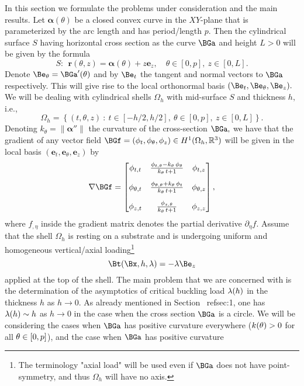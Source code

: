 In this section we formulate the problems under consideration and the main results. Let $\bm\alpha(\theta)$ be a closed convex curve in the $XY$-plane that is parameterized by the arc length and has period/length $p$. Then the cylindrical surface $S$ having horizontal cross section as the curve $\BGa$ and height $L>0$ will be given by the formula 
$$S: \ \ \bm{r}(\theta,z)=\bm\alpha(\theta)+z\bm{e}_z,\quad  \theta\in[0,p],\  z\in[0,L].$$
Denote $\Be_\Gth=\BGa'(\Gth)$ and by $\Be_t$ the tangent and normal vectors to $\BGa$ respectively. This will give rise to the local orthonormal basis 
$(\Be_t,\Be_\Gth,\Be_z).$ We will be dealing with cylindrical shells $\Omega_h$ with mid-surface $S$ and thickness $h,$ i.e., 
\begin{equation}
\label{3.1}
\Omega_{h}=\left\{(t, \theta, z) \ : \ t \in [-h/2,h/2], \ \theta \in[0, p], \ z \in[0, L]\right\}.
\end{equation}
Denoting $k_\theta=\|\bm\alpha''\|$ the curvature of the cross-section $\BGa,$ we have that the gradient of any vector field 
$\BGf=(\phi_t,\phi_\Gth,\phi_z)\in H^1(\Omega_h,\mathbb R^3)$ will be given in the local basis $(\bm{e}_t,\bm{e}_\theta,\bm{e}_z)$ by 
\begin{equation}
\label{3.2}
\nabla \BGf
=\begin{bmatrix}
\phi_{t,t} & \frac{\phi_{t,\theta}-k_{\theta }\,\phi_\theta}{k_{\theta }\,t+1} & \phi_{t,z} \\[10pt]
\phi_{\theta,t} & \frac{\phi_{\theta,\theta}+k_{\theta }\,\phi_t}{k_{\theta }\,t+1} & \phi_{\theta,z}\\[10pt] 
\phi_{z,t} & \frac{\phi_{z,\theta}}{k_{\theta }\,t+1} & \phi_{z,z} 
\end{bmatrix},
\end{equation}
where $f_{,\eta}$ inside the gradient matrix denotes the partial derivative $\partial_\eta f.$ Assume that the shell $\Omega_h$ is resting on a substrate and is undergoing uniform and homogeneous vertical/axial loading\footnote{The terminology "axial load" will be used even if $\BGa$ does not have point-symmetry, and thus $\Omega_h$ will have no axis.} 
\begin{equation}
\label{3.3}
\Bt(\Bx,h,\lambda)=-\lambda \Be_z
\end{equation}
applied at the top of the shell. The main problem that we are concerned with is the determination of the asymptotics of critical buckling load $\lambda(h)$ in the thickness $h$ as $h\to 0.$ As already mentioned in Section~ ref{sec:1}, one has $\lambda(h)\sim h$ as $h\to 0$ in the case when the cross section $\BGa$ is a circle. We will be considering the cases when $\BGa$ has positive curvature everywhere ($k(\theta)>0$ for all $\theta\in [0,p]$), and the case when $\BGa$ has positive curvature 
